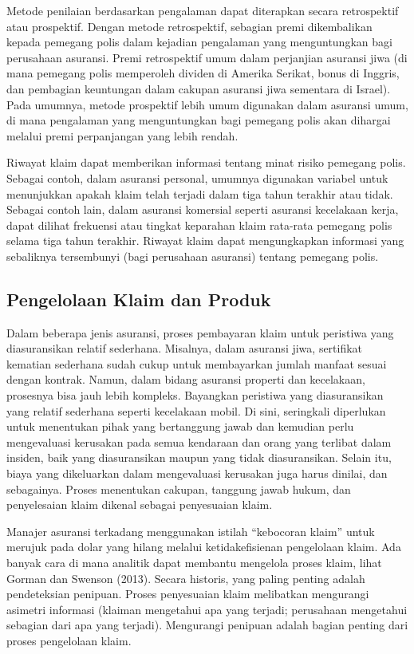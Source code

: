 \documentclass[
]{book}
\begin{document}
Metode penilaian berdasarkan pengalaman dapat diterapkan secara retrospektif atau prospektif. Dengan metode retrospektif, sebagian premi dikembalikan kepada pemegang polis dalam kejadian pengalaman yang menguntungkan bagi perusahaan asuransi. Premi retrospektif umum dalam perjanjian asuransi jiwa (di mana pemegang polis memperoleh dividen di Amerika Serikat, bonus di Inggris, dan pembagian keuntungan dalam cakupan asuransi jiwa sementara di Israel). Pada umumnya, metode prospektif lebih umum digunakan dalam asuransi umum, di mana pengalaman yang menguntungkan bagi pemegang polis akan dihargai melalui premi perpanjangan yang lebih rendah.

Riwayat klaim dapat memberikan informasi tentang minat risiko pemegang polis. Sebagai contoh, dalam asuransi personal, umumnya digunakan variabel untuk menunjukkan apakah klaim telah terjadi dalam tiga tahun terakhir atau tidak. Sebagai contoh lain, dalam asuransi komersial seperti asuransi kecelakaan kerja, dapat dilihat frekuensi atau tingkat keparahan klaim rata-rata pemegang polis selama tiga tahun terakhir. Riwayat klaim dapat mengungkapkan informasi yang sebaliknya tersembunyi (bagi perusahaan asuransi) tentang pemegang polis.

\hypertarget{pengelolaan-klaim-dan-produk}{%
\subsection{Pengelolaan Klaim dan Produk}\label{pengelolaan-klaim-dan-produk}}

Dalam beberapa jenis asuransi, proses pembayaran klaim untuk peristiwa yang diasuransikan relatif sederhana. Misalnya, dalam asuransi jiwa, sertifikat kematian sederhana sudah cukup untuk membayarkan jumlah manfaat sesuai dengan kontrak. Namun, dalam bidang asuransi properti dan kecelakaan, prosesnya bisa jauh lebih kompleks. Bayangkan peristiwa yang diasuransikan yang relatif sederhana seperti kecelakaan mobil. Di sini, seringkali diperlukan untuk menentukan pihak yang bertanggung jawab dan kemudian perlu mengevaluasi kerusakan pada semua kendaraan dan orang yang terlibat dalam insiden, baik yang diasuransikan maupun yang tidak diasuransikan. Selain itu, biaya yang dikeluarkan dalam mengevaluasi kerusakan juga harus dinilai, dan sebagainya. Proses menentukan cakupan, tanggung jawab hukum, dan penyelesaian klaim dikenal sebagai penyesuaian klaim.

Manajer asuransi terkadang menggunakan istilah ``kebocoran klaim'' untuk merujuk pada dolar yang hilang melalui ketidakefisienan pengelolaan klaim. Ada banyak cara di mana analitik dapat membantu mengelola proses klaim, lihat Gorman dan Swenson (2013). Secara historis, yang paling penting adalah pendeteksian penipuan. Proses penyesuaian klaim melibatkan mengurangi asimetri informasi (klaiman mengetahui apa yang terjadi; perusahaan mengetahui sebagian dari apa yang terjadi). Mengurangi penipuan adalah bagian penting dari proses pengelolaan klaim.
\end{document}
